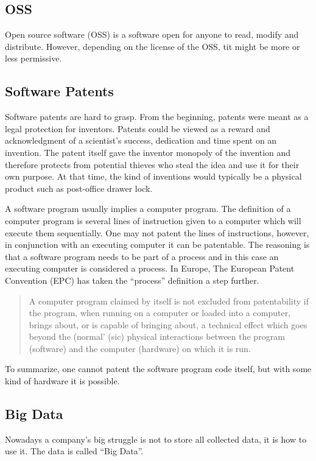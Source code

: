 \documentclass[conference]{IEEEtran}
\begin{document}
\subsection{OSS}
Open source software (OSS) is a software open for anyone to read, modify and distribute. However, depending on the license of the OSS, tit might be more or less permissive. \cite{OSS}

\subsection{Software Patents}
Software patents are hard to grasp. From the beginning, patents were meant as a legal protection for inventors. Patents could be viewed as a reward and acknowledgment of a scientist's success, dedication and time spent on an invention. The patent itself gave the inventor monopoly of the invention and therefore protects from potential thieves who steal the idea and use it for their own purpose. \cite{SoftwarePatent} At that time, the kind of inventions would typically be a physical product such as post-office drawer lock.\cite{LockPatent}

A software program usually implies a computer program. The definition of a computer program is several lines of instruction given to a computer which will execute them sequentially. One may not patent the lines of instructions, however, in conjunction with an executing computer it can be patentable. The reasoning is that a software program needs to be part of a process and in this case an executing computer is considered a process. In Europe, The European Patent Convention (EPC) has taken the ``process'' definition a step further. \cite{SoftwarePatent}
\begin{quotation}
A computer program claimed by itself is not excluded from patentability if the program, when running on a computer or loaded into a computer, brings about, or is capable of bringing about, a technical effect which goes beyond the (normal' (sic) physical interactions between the program (software) and the computer (hardware) on which it is run. \cite[p. 36]{SoftwarePatent}
\end{quotation} 

To summarize, one cannot patent the software program code itself, but with some kind of hardware it is possible.
\subsection{Big Data}
Nowadays a company's big struggle is not to store all collected data, it is how to use it. The data is called ``Big Data''. \cite{ExploitBigData}
\end{document}
